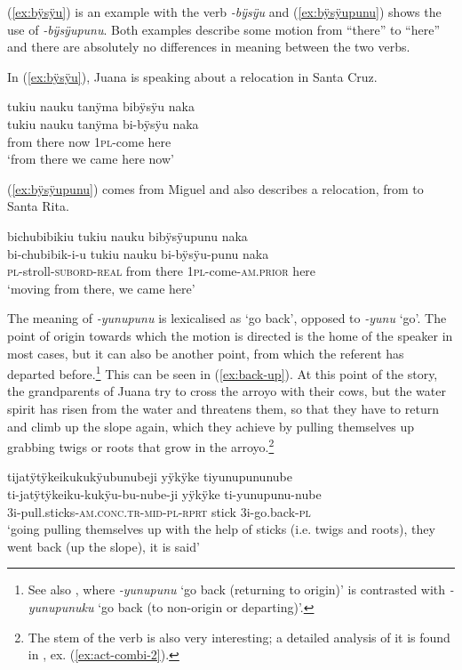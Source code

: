 (\ref{ex:bÿsÿu}) is an example with the verb \textit{-bÿsÿu} and (\ref{ex:bÿsÿupunu}) shows the use of \textit{-bÿsÿupunu}. Both examples describe some motion from “there” to “here” and there are absolutely no differences in meaning between the two verbs.

In (\ref{ex:bÿsÿu}), Juana is speaking about a relocation in Santa Cruz.

\ea\label{ex:bÿsÿu}
\begingl 
\glpreamble tukiu nauku tanÿma bibÿsÿu naka\\
\gla tukiu nauku tanÿma bi-bÿsÿu naka\\ 
\glb from there now 1\textsc{pl}-come here\\ 
\glft ‘from there we came here now’\\ 
\endgl
\trailingcitation{[jxx-p110923l-1.182]}
\xe

(\ref{ex:bÿsÿupunu}) comes from Miguel and also describes a relocation, from  to Santa Rita.

\ea\label{ex:bÿsÿupunu}
\begingl 
\glpreamble bichubibikiu tukiu nauku bibÿsÿupunu naka\\
\gla bi-chubibik-i-u tukiu nauku bi-bÿsÿu-punu naka\\ 
\textsc{pl}-stroll-\textsc{subord}-\textsc{real} from there 1\textsc{pl}-come-\textsc{am.prior} here\\ 
\glft ‘moving from there, we came here’\\ 
\endgl
\trailingcitation{[mxx-p110825l.181]}
\xe


The meaning of \textit{-yunupunu} is lexicalised as ‘go back’, opposed to \textit{-yunu} ‘go’. The point of origin towards which the motion is directed is the home of the speaker in most cases, but it can also be another point, from which the referent has departed before.\footnote{See also , where \textit{-yunupunu} ‘go back (returning to origin)’ is contrasted with \textit{-yunupunuku} ‘go back (to non-origin or departing)’.} 
 This can be seen in (\ref{ex:back-up}). At this point of the story, the grandparents of Juana try to cross the arroyo with their cows, but the water spirit has risen from the water and threatens them, so that they have to return and climb up the slope again, which they achieve by pulling themselves up grabbing twigs or roots that grow in the arroyo.\footnote{The stem of the verb is also very interesting; a detailed analysis of it is found in , ex. (\ref{ex:act-combi-2}).}

\ea\label{ex:back-up}
\begingl 
\glpreamble tijatÿtÿkeikukukÿubunubeji yÿkÿke tiyunupununube\\
\gla ti-jatÿtÿkeiku-kukÿu-bu-nube-ji yÿkÿke ti-yunupunu-nube\\ 
\glb 3i-pull.sticks-\textsc{am.conc.tr}-\textsc{mid}-\textsc{pl}-\textsc{rprt} stick 3i-go.back-\textsc{pl}\\ 
\glft ‘going pulling themselves up with the help of sticks (i.e. twigs and roots), they went back (up the slope), it is said’\\ 
\endgl
\trailingcitation{[jxx-p151016l-2]}
\xe

